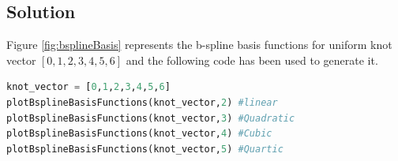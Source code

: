 \documentclass[a4paper, 11pt]{article}
\begin{document}
\begin{enumerate}
\begin{enumerate}[label=\alph*.]
    \subsection*{Solution}
    Figure \ref{fig:bsplineBasis} represents the b-spline basis functions for uniform knot vector \([0,1,2,3,4,5,6]\) and the following code has been used to generate it. 
    \begin{lstlisting}[language=Python]
knot_vector = [0,1,2,3,4,5,6]
plotBsplineBasisFunctions(knot_vector,2) #linear
plotBsplineBasisFunctions(knot_vector,3) #Quadratic
plotBsplineBasisFunctions(knot_vector,4) #Cubic
plotBsplineBasisFunctions(knot_vector,5) #Quartic
\end{lstlisting} 
    \begin{figure}[ht] 
 \quad 
\end{figure}
\end{enumerate}
\end{enumerate}
\end{document}
